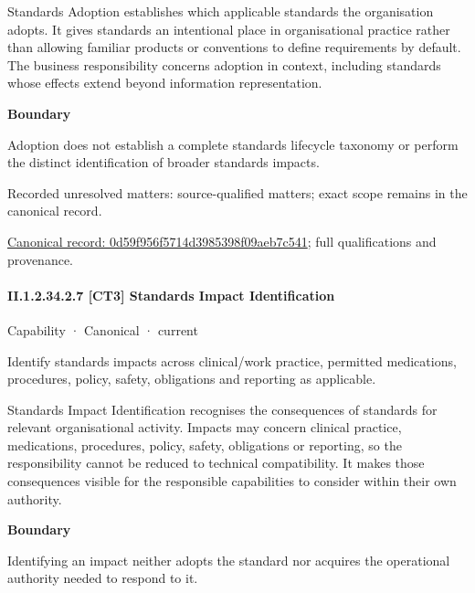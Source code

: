 Standards Adoption establishes which applicable standards the organisation adopts. It gives standards an intentional place in organisational practice rather than allowing familiar products or conventions to define requirements by default. The business responsibility concerns adoption in context, including standards whose effects extend beyond information representation.



\textbf{Boundary}



Adoption does not establish a complete standards lifecycle taxonomy or perform the distinct identification of broader standards impacts.


{\small Recorded unresolved matters: source-qualified matters; exact scope remains in the canonical record.}\par
{\footnotesize \href{../../../../continuum/strategy/capability/0d59f956f5714d3985398f09aeb7c541.md}{Canonical record: 0d59f956f5714d3985398f09aeb7c541}; full qualifications and provenance.}\par
\paragraph*{II.1.2.34.2.7 [CT3] Standards Impact Identification}
\label{navigation:II.1.2.34.2.7}

\label{element:6b9c96c7d9174e7fbfd11267673d42f3}
{\small Capability · Canonical · current}\par

Identify standards impacts across clinical/work practice, permitted medications, procedures, policy, safety, obligations and reporting as applicable.



Standards Impact Identification recognises the consequences of standards for relevant organisational activity. Impacts may concern clinical practice, medications, procedures, policy, safety, obligations or reporting, so the responsibility cannot be reduced to technical compatibility. It makes those consequences visible for the responsible capabilities to consider within their own authority.



\textbf{Boundary}



Identifying an impact neither adopts the standard nor acquires the operational authority needed to respond to it.


